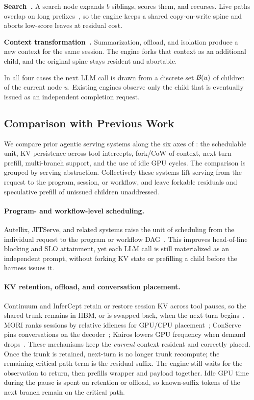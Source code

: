 \smallskip\noindent\textbf{Search~\cite{tot,mctsllm,hive}.}
A search node expands $b$ siblings, scores them, and recurses.
Live paths overlap on long prefixes~\cite{hive}, so the engine keeps a shared copy-on-write spine and aborts low-score leaves at residual cost.

\smallskip\noindent\textbf{Context transformation~\cite{smoothagent,memgpt,contextrot}.}
Summarization, offload, and isolation produce a new context for the same session.
The engine forks that context as an additional child, and the original spine stays resident and abortable.

In all four cases the next LLM call is drawn from a discrete set $\mathcal{B}(u)$ of children of the current node $u$.
Existing engines observe only the child that is eventually issued as an independent completion request.

\subsection{Comparison with Previous Work}
\label{sec:prior}
We compare prior agentic serving systems along the six axes of : the schedulable unit, KV persistence across tool intercepts, fork/CoW of context, next-turn prefill, multi-branch support, and the use of idle GPU cycles.
The comparison is grouped by serving abstraction.
Collectively these systems lift serving from the request to the program, session, or workflow, and leave forkable residuals and speculative prefill of unissued children unaddressed.

\paragraph{Program- and workflow-level scheduling.}
Autellix, JITServe, and related systems raise the unit of scheduling from the individual request to the program or workflow DAG~\cite{autellix,jitserve,hermes,saga,pythia,thunderagent,ayo,parrot,murakkab}.
This improves head-of-line blocking and SLO attainment, yet each LLM call is still materialized as an independent prompt, without forking KV state or prefilling a child before the harness issues it.

\paragraph{KV retention, offload, and conversation placement.}
Continuum and InferCept retain or restore session KV across tool pauses, so the shared trunk remains in HBM, or is swapped back, when the next turn begins~\cite{continuum,infercept}.
MORI ranks sessions by relative idleness for GPU/CPU placement~\cite{mori}; ConServe pins conversations on the decoder~\cite{conserve}; Kairos lowers GPU frequency when demand drops~\cite{kairospower}.
These mechanisms keep the \emph{current} context resident and correctly placed.
Once the trunk is retained, next-turn \ttft{} is no longer trunk recompute; the remaining critical-path term is the residual suffix.
The engine still waits for the observation to return, then prefills wrapper and payload together.
Idle GPU time during the pause is spent on retention or offload, so known-suffix tokens of the next branch remain on the critical path.

